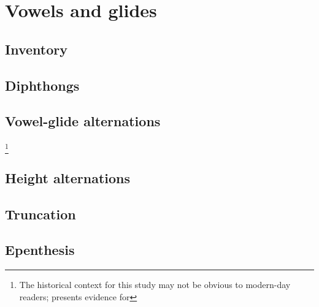 \chapter{Vowels and glides}

\section{Inventory}

\section{Diphthongs}

\section{Vowel-glide alternations}

\citet{Hill1954}
\footnote{The historical context for this study may not be obvious to modern-day readers; \citeauthor{Hill1954} presents evidence for}

\section{Height alternations}

\section{Truncation}

\section{Epenthesis}
